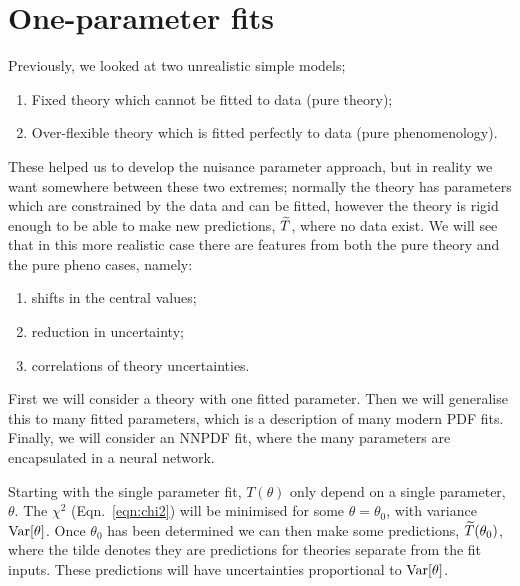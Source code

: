 \section{One-parameter fits}
\label{sec:p2}
Previously, we looked at two unrealistic simple models;
\begin{enumerate}
\item Fixed theory which cannot be fitted to data (pure theory);
\item Over-flexible theory which is fitted perfectly to data (pure phenomenology).
\end{enumerate}
These helped us to develop the nuisance parameter approach, but in reality we want somewhere between these two extremes; normally the theory has parameters which are constrained by the data and can be fitted, however the theory is rigid enough to be able to make new predictions, $\widetilde{T}$, where no data exist. We will see that in this more realistic case there are features from both the pure theory and the pure pheno cases, namely:
\begin{enumerate}
\item shifts in the central values;
\item reduction in uncertainty;
\item correlations of theory uncertainties.
\end{enumerate}
First we will consider a theory with one fitted parameter. Then we will generalise this to many fitted parameters, which is a description of many modern PDF fits. Finally, we will consider an NNPDF fit, where the many parameters are encapsulated in a neural network. 

Starting with the single parameter fit, $T(\theta)$ only depend on a single parameter, $\theta$. The $\chi^2$ (Eqn.~\ref{eqn:chi2}) will be minimised for some $\theta = \theta_0$, with variance ${\rm Var} [\theta]$. Once $\theta_0$ has been determined we can then make some predictions, $\widetilde{T}(\theta_0)$, where the tilde denotes they are predictions for theories separate from the fit inputs. These predictions will have uncertainties proportional to ${\rm Var} [\theta]$. 

